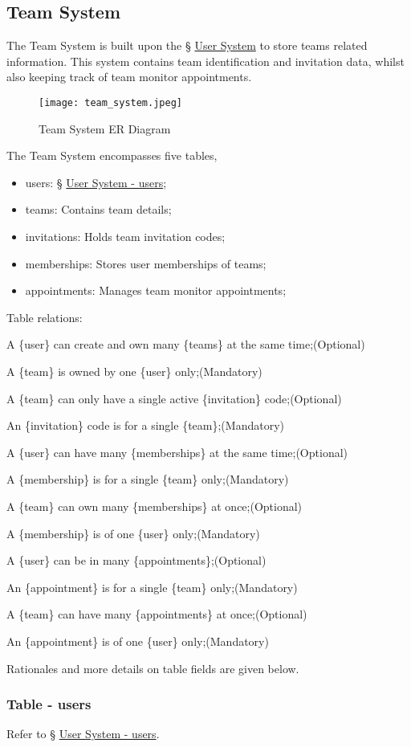\documentclass[12pt]{report}
\newcommand{\n}{\par}
\newcommand{\br}{\n\vspace{1 em}\n}
\begin{document}
\subsection{Team System} \label{data-layer.design.team-system}
The Team System is built upon the \S{} \hyperref[data-layer.design.user-system]{User System} to store teams related information.
This system contains team identification and invitation data,
whilst also keeping track of team monitor appointments.
\br
\begin{figure}[h!]
	\centering
	\texttt{[image: team\_system.jpeg]}
	\caption{Team System ER Diagram}
	\label{fig:team-system-er}
\end{figure}
\br
The Team System encompasses five tables,
\begin{itemize}
	\item users: \S{} \hyperref[data-layer.design.user-system.users]{User System - users};
	\item teams: Contains team details;
	\item invitations: Holds team invitation codes;
	\item memberships: Stores user memberships of teams;
	\item appointments: Manages team monitor appointments;
\end{itemize}
\br
Table relations:\n
A \{user\} can create and own many \{teams\} at the same time;\null\hfill (Optional)\n
A \{team\} is owned by one \{user\} only;\null\hfill (Mandatory)
\br
A \{team\} can only have a single active \{invitation\} code;\null\hfill (Optional)\n
An \{invitation\} code is for a single \{team\};\null\hfill (Mandatory)
\br
A \{user\} can have many \{memberships\} at the same time;\null\hfill (Optional)\n
A \{membership\} is for a single \{team\} only;\null\hfill (Mandatory)
\br
A \{team\} can own many \{memberships\} at once;\null\hfill (Optional)\n
A \{membership\} is of one \{user\} only;\null\hfill (Mandatory)
\br
A \{user\} can be in many \{appointments\};\null\hfill (Optional)\n
An \{appointment\} is for a single \{team\} only;\null\hfill (Mandatory)
\br
A \{team\} can have many \{appointments\} at once;\null\hfill (Optional)\n
An \{appointment\} is of one \{user\} only;\null\hfill (Mandatory)
\br
Rationales and more details on table fields are given below.

\subsubsection{Table - users} \label{data-layer.design.team-system.users}
Refer to \S{} \hyperref[data-layer.design.user-system.users]{User System - users}.
\end{document}
